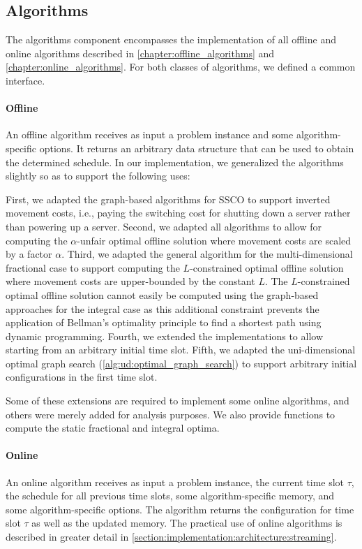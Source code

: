 \subsection{Algorithms}

The algorithms component encompasses the implementation of all offline and online algorithms described in \cref{chapter:offline_algorithms} and \cref{chapter:online_algorithms}. For both classes of algorithms, we defined a common interface.

\paragraph{Offline} An offline algorithm receives as input a problem instance and some algorithm-specific options. It returns an arbitrary data structure that can be used to obtain the determined schedule. In our implementation, we generalized the algorithms slightly so as to support the following uses:

First, we adapted the graph-based algorithms for SSCO to support inverted movement costs, i.e., paying the switching cost for shutting down a server rather than powering up a server. Second, we adapted all algorithms to allow for computing the $\alpha$-unfair optimal offline solution where movement costs are scaled by a factor $\alpha$. Third, we adapted the general algorithm for the multi-dimensional fractional case to support computing the $L$-constrained optimal offline solution where movement costs are upper-bounded by the constant $L$. The $L$-constrained optimal offline solution cannot easily be computed using the graph-based approaches for the integral case as this additional constraint prevents the application of Bellman's optimality principle to find a shortest path using dynamic programming. Fourth, we extended the implementations to allow starting from an arbitrary initial time slot. Fifth, we adapted the uni-dimensional optimal graph search (\cref{alg:ud:optimal_graph_search}) to support arbitrary initial configurations in the first time slot.

Some of these extensions are required to implement some online algorithms, and others were merely added for analysis purposes. We also provide functions to compute the static fractional and integral optima.

\paragraph{Online} An online algorithm receives as input a problem instance, the current time slot $\tau$, the schedule for all previous time slots, some algorithm-specific memory, and some algorithm-specific options. The algorithm returns the configuration for time slot $\tau$ as well as the updated memory. The practical use of online algorithms is described in greater detail in \cref{section:implementation:architecture:streaming}.

